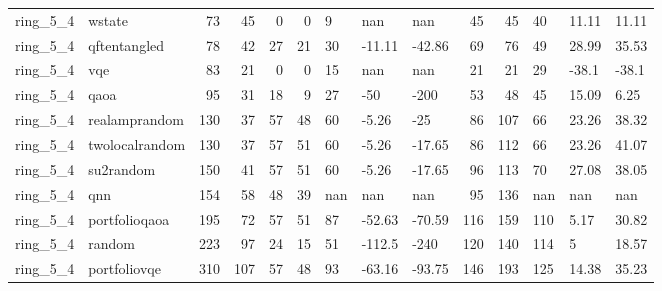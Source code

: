 \begin{longtable}{llrrrrlllrrlll}
ring\_5\_4 & wstate & 73 & 45 & 0 & 0 & 9 & nan & nan & 45 & 45 & 40 & 11.11 & 11.11 \\
ring\_5\_4 & qftentangled & 78 & 42 & 27 & 21 & 30 & -11.11 & -42.86 & 69 & 76 & 49 & 28.99 & 35.53 \\
ring\_5\_4 & vqe & 83 & 21 & 0 & 0 & 15 & nan & nan & 21 & 21 & 29 & -38.1 & -38.1 \\
ring\_5\_4 & qaoa & 95 & 31 & 18 & 9 & 27 & -50 & -200 & 53 & 48 & 45 & 15.09 & 6.25 \\
ring\_5\_4 & realamprandom & 130 & 37 & 57 & 48 & 60 & -5.26 & -25 & 86 & 107 & 66 & 23.26 & 38.32 \\
ring\_5\_4 & twolocalrandom & 130 & 37 & 57 & 51 & 60 & -5.26 & -17.65 & 86 & 112 & 66 & 23.26 & 41.07 \\
ring\_5\_4 & su2random & 150 & 41 & 57 & 51 & 60 & -5.26 & -17.65 & 96 & 113 & 70 & 27.08 & 38.05 \\
ring\_5\_4 & qnn & 154 & 58 & 48 & 39 & nan & nan & nan & 95 & 136 & nan & nan & nan \\
ring\_5\_4 & portfolioqaoa & 195 & 72 & 57 & 51 & 87 & -52.63 & -70.59 & 116 & 159 & 110 & 5.17 & 30.82 \\
ring\_5\_4 & random & 223 & 97 & 24 & 15 & 51 & -112.5 & -240 & 120 & 140 & 114 & 5 & 18.57 \\
ring\_5\_4 & portfoliovqe & 310 & 107 & 57 & 48 & 93 & -63.16 & -93.75 & 146 & 193 & 125 & 14.38 & 35.23 \\
\end{longtable}
